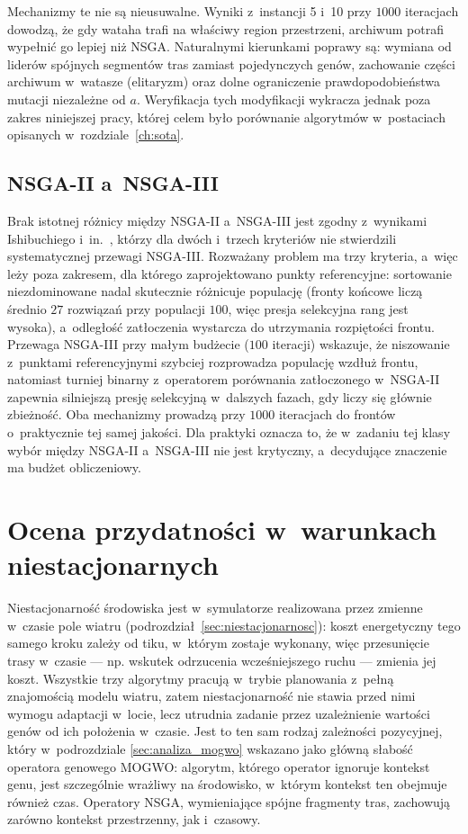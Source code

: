 Mechanizmy te nie są nieusuwalne. Wyniki z~instancji 5 i~10 przy $1000$
iteracjach dowodzą, że gdy wataha trafi na właściwy region przestrzeni, archiwum
potrafi wypełnić go lepiej niż NSGA. Naturalnymi kierunkami poprawy są: wymiana
od liderów spójnych segmentów tras zamiast pojedynczych genów, zachowanie części
archiwum w~watasze (elitaryzm) oraz dolne ograniczenie prawdopodobieństwa mutacji
niezależne od $a$. Weryfikacja tych modyfikacji wykracza jednak poza zakres
niniejszej pracy, której celem było porównanie algorytmów w~postaciach opisanych
w~rozdziale~\ref{ch:sota}.

\subsection{NSGA-II a~NSGA-III}
\label{sec:analiza_nsga}
Brak istotnej różnicy między NSGA-II a~NSGA-III jest zgodny z~wynikami
Ishibuchiego i~in.~\cite{ishibuchi2016nsga}, którzy dla dwóch i~trzech kryteriów
nie stwierdzili systematycznej przewagi NSGA-III. Rozważany problem ma trzy
kryteria, a~więc leży poza zakresem, dla którego zaprojektowano punkty
referencyjne: sortowanie niezdominowane nadal skutecznie różnicuje populację
(fronty końcowe liczą średnio $27$ rozwiązań przy populacji $100$, więc presja
selekcyjna rang jest wysoka), a~odległość zatłoczenia wystarcza do utrzymania
rozpiętości frontu. Przewaga NSGA-III przy małym budżecie ($100$ iteracji)
wskazuje, że niszowanie z~punktami referencyjnymi szybciej rozprowadza populację
wzdłuż frontu, natomiast turniej binarny z~operatorem porównania zatłoczonego
w~NSGA-II zapewnia silniejszą presję selekcyjną w~dalszych fazach, gdy liczy się
głównie zbieżność. Oba mechanizmy prowadzą przy $1000$ iteracjach do frontów
o~praktycznie tej samej jakości. Dla praktyki oznacza to, że w~zadaniu tej klasy
wybór między NSGA-II a~NSGA-III nie jest krytyczny, a~decydujące znaczenie ma
budżet obliczeniowy.

\section{Ocena przydatności w~warunkach niestacjonarnych}
\label{sec:analiza_niestacjonarnosc}

Niestacjonarność środowiska jest w~symulatorze realizowana przez zmienne w~czasie
pole wiatru (podrozdział~\ref{sec:niestacjonarnosc}): koszt energetyczny tego
samego kroku zależy od tiku, w~którym zostaje wykonany, więc przesunięcie trasy
w~czasie --- np. wskutek odrzucenia wcześniejszego ruchu --- zmienia jej koszt.
Wszystkie trzy algorytmy pracują w~trybie planowania z~pełną znajomością modelu
wiatru, zatem niestacjonarność nie stawia przed nimi wymogu adaptacji w~locie,
lecz utrudnia zadanie przez uzależnienie wartości genów od ich położenia w~czasie.
Jest to ten sam rodzaj zależności pozycyjnej, który w~podrozdziale
\ref{sec:analiza_mogwo} wskazano jako główną słabość operatora genowego MOGWO:
algorytm, którego operator ignoruje kontekst genu, jest szczególnie wrażliwy na
środowisko, w~którym kontekst ten obejmuje również czas. Operatory NSGA, wymieniające
spójne fragmenty tras, zachowują zarówno kontekst przestrzenny, jak i~czasowy.

